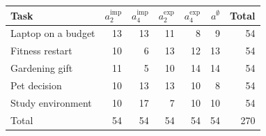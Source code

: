 \begin{tabular}{@{}l r r r r r r@{}}
\toprule
Task & \(a^{\mathrm{imp}}_{2}\) & \(a^{\mathrm{imp}}_{4}\) & \(a^{\mathrm{exp}}_{2}\) & \(a^{\mathrm{exp}}_{4}\) & \(a^{\emptyset}\) & Total \\
\midrule
Laptop on a budget & 13 & 13 & 11 & 8 & 9 & 54 \\
Fitness restart & 10 & 6 & 13 & 12 & 13 & 54 \\
Gardening gift & 11 & 5 & 10 & 14 & 14 & 54 \\
Pet decision & 10 & 13 & 13 & 10 & 8 & 54 \\
Study environment & 10 & 17 & 7 & 10 & 10 & 54 \\
\midrule
Total & 54 & 54 & 54 & 54 & 54 & 270 \\
\bottomrule
\end{tabular}
